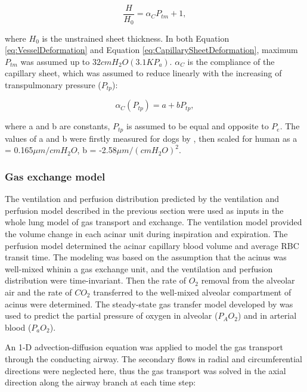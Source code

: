 \begin{equation}
 \label{eq:CapillarySheetDeformation}
 \frac{H}{H_0} = \alpha_C P_{tm} + 1,
\end{equation}

\noindent where $H_0$ is the unstrained sheet thickness. In both Equation \ref{eq:VesselDeformation} and Equation \ref{eq:CapillarySheetDeformation}, maximum $P_{tm}$ was assumed up to $32cmH_2 O(3.1KP_a)$. $\alpha_C$ is the compliance of the capillary sheet, which was assumed to reduce linearly with the increasing of transpulmonary pressure ($P_{tp}$):

\begin{equation} 
 \label{eq:CapillaryCompliance}
 \alpha_C(P_{tp}) = a + bP_{tp},
\end{equation}

\noindent where a and b are constants, $P_{tp}$ is assumed to be equal and opposite to $P_e$. The values of a and b were firstly measured for dogs by \cite{glazier1969measurements}, then scaled for human as a = 0.165$\mu m/cmH_2O$, b = -2.58$\mu m/{(cmH_2O)}^2$.

\subsubsection{Gas exchange model}
The ventilation and perfusion distribution predicted by the ventilation and perfusion model described in the previous section were used as inputs in the whole lung model of gas transport and exchange. The ventilation model provided the volume change in each acinar unit during inspiration and expiration. The perfusion model determined the acinar capillary blood volume and average RBC transit time. The modeling was based on the assumption that the acinus was well-mixed whinin a gas exchange unit, and the ventilation and perfusion distribution were time-invariant. Then the rate of $O_2$ removal from the alveolar air and the rate of $CO_2$ transferred to the well-mixed alveolar compartment of acinus were determined. The steady-state gas transfer model developed by \cite{kapitan1986computer, swan2010multi} was used to predict the partial pressure of oxygen in alveolar ($P_AO_2$) and in arterial blood ($P_aO_2$).

An 1-D advection-diffusion equation was applied to model the gas transport through the conducting airway. The secondary flows in radial and circumferential directions were neglected here, thus the gas transport was solved in the axial direction along the airway branch at each time step:

